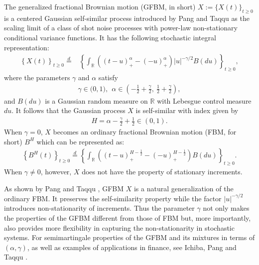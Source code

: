 \documentclass[11pt, reqno]{amsart}
\numberwithin{equation}{section}
\newcommand{\1}{{\bf 1}}
\newcommand{\2}{{\bf 2}}
\begin{document}
The generalized fractional Brownian motion (GFBM, in  short) $X:=\{X(t)\}_{t\ge0}$ is a centered Gaussian  self-similar
process introduced by Pang and Taqqu \cite{PT2019} as the scaling limit of a class of shot noise processes with power-law
non-stationary conditional variance functions. It has the following stochastic integral representation:
 \begin{align}\label{eq X}
 \left\{X(t)\right\}_{t\ge0}\overset{d}{=}&\left\{  \int_{\mathbb R}  \left((t-u)_+^{\alpha}-(-u)_+^{\alpha} \right) |u|^{-\gamma/2}
  B(du)  \right\}_{t\ge0},
 \end{align}
 where the parameters $\gamma$ and $\alpha$ satisfy
 \begin{align}\label{eq constant}
 \gamma\in  {(}0,1),  \ \  \alpha\in \left(-\frac12+\frac{\gamma}{2}, \  \frac12+\frac{\gamma}{2} \right),
 \end{align}
and   $B(du)$ is a Gaussian random measure on $\mathbb R$ with   Lebesgue  control measure $du$.
It follows that the Gaussian process $X$ is self-similar with index   given by
 \begin{align}\label{Eq:H}
 H=\alpha-\frac{\gamma}{2}+\frac12\in(0,1).
 \end{align}
When $\gamma=0$, $X$ becomes an ordinary fractional Brownian motion  (FBM, for short) $B^H$ which
can be represented as:
\begin{align*}%
\left\{B^H(t)\right\}_{t\ge 0}\overset{d}{=}\left\{ \int_{\mathbb R}
\left((t-u)_+^{H-\frac12}-(-u)_+^{H-\frac12} \right) B(du)  \right\}_{t\ge0}.
\end{align*}
  When $\gamma \ne 0$, however, $X$ does not have the property of stationary increments.


As shown by Pang and Taqqu \cite{PT2019},  GFBM $X$ is a natural generalization of the ordinary FBM.
It preserves the self-similarity property while the factor $|u|^{-\gamma/2}$ introduces non-stationarity of increments.
Thus the parameter $\gamma$ not only makes the properties of the GFBM different from those of FBM but,
more importantly, also provides more flexibility in capturing the non-stationarity in stochastic systems.
 For  semimartingale properties of  the  GFBM and its mixtures in terms of $(\alpha,\gamma)$, as well as examples of applications in finance,  see Ichiba, Pang and Taqqu \cite{IPT2020b}.
 
\end{document}
